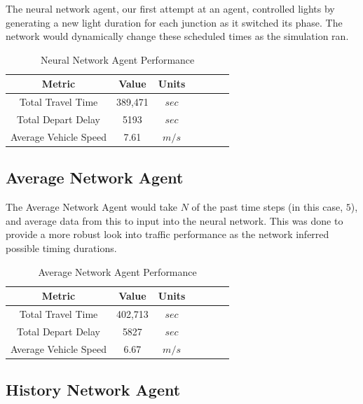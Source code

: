\documentclass[twocolumn]{article}
\begin{document}
The neural network agent, our first attempt at an agent, controlled lights by generating a new light duration for each junction as it switched its phase. The network would dynamically change these scheduled times as the simulation ran.

\begin{table}[H]
    \centering
    \begin{tabular}{|c|c|c|c|c|c|c|}
        \hline
         Metric & Value & Units \\
        \hline\hline
        Total Travel Time & 389,471 & $sec$ \\
        \hline
        Total Depart Delay & 5193 & $sec$ \\
        \hline
        Average Vehicle Speed & 7.61 & $m/s$ \\
        \hline
    \end{tabular}
    \caption{Neural Network Agent Performance}
    \label{tab:nn_agent_perf}
\end{table}

\subsection{Average Network Agent}

The Average Network Agent would take $N$ of the past time steps (in this case, $5$), and average data from this to input into the neural network. This was done to provide a more robust look into traffic performance as the network inferred possible timing durations.

\begin{table}[H]
    \centering
    \begin{tabular}{|c|c|c|c|c|c|c|}
        \hline
         Metric & Value & Units \\
        \hline\hline
        Total Travel Time & 402,713 & $sec$ \\
        \hline
        Total Depart Delay & 5827 & $sec$ \\
        \hline
        Average Vehicle Speed & 6.67 & $m/s$ \\
        \hline
    \end{tabular}
    \caption{Average Network Agent Performance}
    \label{tab:average_agent_perf}
\end{table}

\subsection{History Network Agent}
\end{document}
